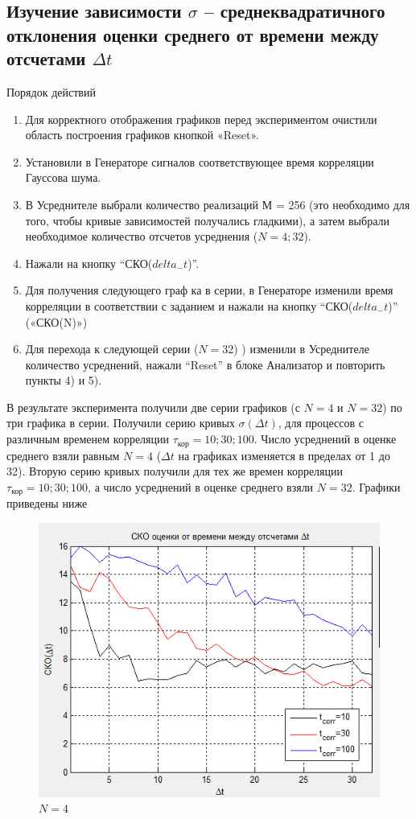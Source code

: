 \begin{enumerate}
\subsection[Задание 4]{Изучение зависимости $\sigma$ -- среднеквадратичного отклонения оценки среднего от времени между отсчетами $\Delta t$}
Порядок действий
\begin{enumerate}
	\item Для корректного отображения графиков перед экспериментом очистили область построения графиков кнопкой «Reset».
	\item Установили в Генераторе сигналов соответствующее время корреляции Гауссова шума.
	\item В Усреднителе выбрали количество реализаций М = 256 (это необходимо для того, чтобы кривые зависимостей получались гладкими), а затем выбрали необходимое количество отсчетов усреднения ($N = 4; 32$).
	\item Нажали на кнопку “СКО($delta_{-}t$)”.
	\item Для получения следующего граф ка в серии, в Генераторе изменили время корреляции в соответствии с заданием и нажали на кнопку “СКО($delta_{-}t$)” («СКО(N)»)
	\item Для перехода к следующей серии ($N=32$) ) изменили в Усреднителе количество усреднений, нажали “Reset” в блоке Анализатор и повторить пункты 4) и 5).
\end{enumerate}
В результате эксперимента получили две серии графиков (с $N = 4$ и $N = 32$) по три графика в серии.
Получили серию кривых $\sigma(\Delta t)$, для процессов с различным временем корреляции $\tau_\text{кор}= 10; 30; 100$. Число усреднений в оценке среднего взяли равным $N = 4$ ($\Delta t$ на графиках изменяется в пределах от 1 до 32).
Вторую серию кривых получили для тех же времен корреляции $\tau_\text{кор}= 10; 30; 100$, а число усреднений в оценке среднего взяли $N = 32$.
Графики приведены ниже
\begin{figure}[H]
	\centering
    \includegraphics[width=.8\linewidth]{fig/fig41}
	\caption{$N = 4$}
    \label{fig:4.1}
\end{figure}


\end{enumerate}

